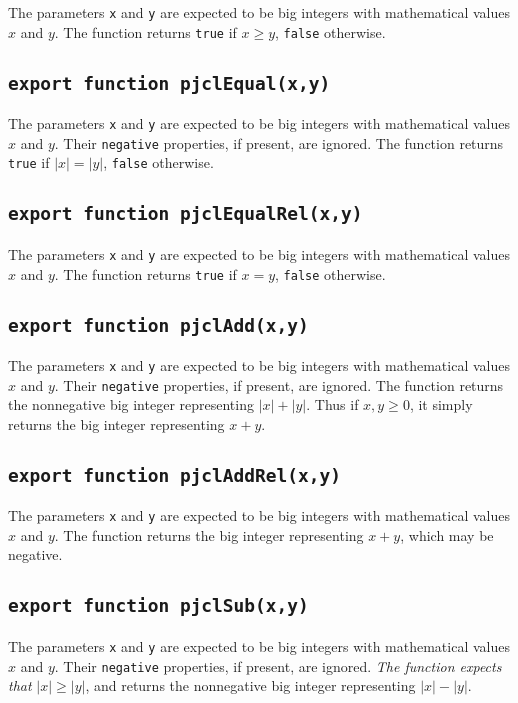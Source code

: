 \documentclass[12pt]{article}
\begin{document}
The parameters {\tt x} and {\tt y} are expected to be big integers
with mathematical values $x$ and $y$.  The function returns {\tt true}
if $x \geq y$, {\tt false} otherwise.

\subsection{\tt export function pjclEqual(x,y)}

The parameters {\tt x} and {\tt y} are expected to be big integers
with mathematical values $x$ and $y$.  Their {\tt negative}
properties, if present, are ignored.  The function returns {\tt true}
if $|x| = |y|$, {\tt false} otherwise.

\subsection{\tt export function pjclEqualRel(x,y)}

The parameters {\tt x} and {\tt y} are expected to be big integers
with mathematical values $x$ and $y$.  The function returns {\tt true}
if $x = y$, {\tt false} otherwise.

\subsection{\tt export function pjclAdd(x,y)}

The parameters {\tt x} and {\tt y} are expected to be big integers
with mathematical values $x$ and $y$.  Their {\tt negative}
properties, if present, are ignored.  The function returns the
nonnegative big integer representing $|x| + |y|$.  Thus if $x, y \geq 0$,
it simply returns the big integer representing $x+y$.

\subsection{\tt export function pjclAddRel(x,y)}

The parameters {\tt x} and {\tt y} are expected to be big integers
with mathematical values $x$ and $y$.  The function returns
the big integer representing $x+y$, which may be negative.

\subsection{\tt export function pjclSub(x,y)}

The parameters {\tt x} and {\tt y} are expected to be big integers
with mathematical values $x$ and $y$.  Their {\tt negative}
properties, if present, are ignored.  {\em The function expects
  that\/} $|x| \geq |y|$, and returns the nonnegative big integer
representing $|x| - |y|$.
\end{document}
